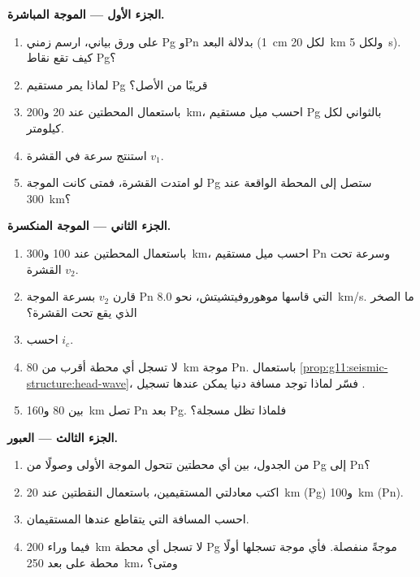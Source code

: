 \begin{problem}
\medskip
\noindent\textbf{الجزء الأول --- الموجة المباشرة.}
\begin{enumerate}
  \item على ورق بياني، ارسم زمني Pg وPn بدلالة البعد (\qty{1}{cm}
        لكل \qty{20}{km} ولكل \qty{5}{s}). كيف تقع نقاط Pg؟
  \item لماذا يمر مستقيم Pg قريبًا من الأصل؟
  \item باستعمال المحطتين عند 20 و\qty{200}{km}، احسب ميل
        مستقيم Pg بالثواني لكل كيلومتر.
  \item استنتج سرعة  في القشرة $v_1$.
  \item لو امتدت القشرة، فمتى كانت الموجة Pg ستصل إلى المحطة الواقعة عند
        \qty{300}{km}؟
\end{enumerate}

\medskip
\noindent\textbf{الجزء الثاني --- الموجة المنكسرة.}
\begin{enumerate}[resume]
  \item باستعمال المحطتين عند 100 و\qty{300}{km}، احسب ميل
        مستقيم Pn وسرعة  تحت القشرة $v_2$.
  \item قارن $v_2$ بسرعة الموجة Pn التي قاسها موهوروفيتشيتش،
        نحو \qty{8.0}{km/s}. ما الصخر الذي يقع تحت القشرة؟
  \item احسب  $i_c$.
  \item لا تسجل أي محطة أقرب من \qty{80}{km} موجة Pn. باستعمال
        \cref{prop:g11:seismic-structure:head-wave}، فسّر لماذا توجد
        مسافة دنيا يمكن عندها تسجيل .
  \item بين 80 و\qty{160}{km} تصل Pn بعد Pg. فلماذا تظل
        مسجلة؟
\end{enumerate}

\medskip
\noindent\textbf{الجزء الثالث --- العبور.}
\begin{enumerate}[resume]
  \item من الجدول، بين أي محطتين تتحول الموجة الأولى
        وصولًا من Pg إلى Pn؟
  \item اكتب معادلتي المستقيمين، باستعمال النقطتين عند
        \qty{20}{km} (Pg) و\qty{100}{km} (Pn).
  \item احسب المسافة التي يتقاطع عندها المستقيمان.
  \item فيما وراء \qty{200}{km} لا تسجل أي محطة Pg موجةً منفصلة. فأي
        موجة تسجلها أولًا محطة على بعد \qty{250}{km}، ومتى؟
\end{enumerate}


\end{problem}
